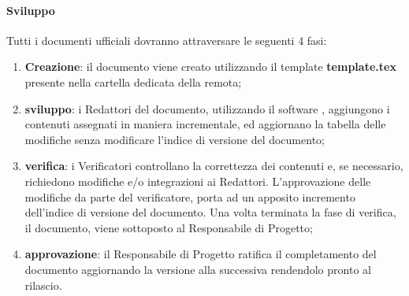 		\paragraph{Sviluppo}
		Tutti i documenti ufficiali dovranno attraversare le seguenti 4 fasi:
		\begin{enumerate}
			\item \textbf{Creazione}: il documento viene creato utilizzando il template \textbf{template.tex} presente nella cartella dedicata della  remota;
			\item \textbf{sviluppo}: i Redattori del documento, utilizzando il software , aggiungono i contenuti assegnati in maniera incrementale, ed aggiornano la tabella delle modifiche senza modificare l'indice di versione del documento;
			\item \textbf{verifica}: i Verificatori controllano la correttezza dei contenuti e, se necessario, richiedono modifiche e/o integrazioni ai Redattori. L'approvazione delle modifiche da parte del verificatore, porta ad un apposito incremento dell'indice di versione del documento. Una volta terminata la fase di verifica, il documento, viene sottoposto al Responsabile di Progetto;
			\item \textbf{approvazione}: il Responsabile di Progetto ratifica il completamento del documento aggiornando la versione alla  successiva rendendolo pronto al rilascio.
		\end{enumerate}

